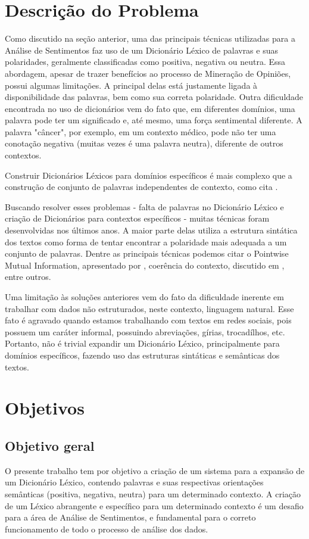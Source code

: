 \documentclass[a4paper,11pt]{article}
\begin{document}
\section{Descrição do Problema}
Como discutido na seção anterior, uma das principais técnicas utilizadas para a Análise de Sentimentos faz uso de um Dicionário Léxico de palavras e suas polaridades, geralmente classificadas como positiva, negativa ou neutra. Essa abordagem, apesar de trazer benefícios ao processo de Mineração de Opiniões, possui algumas limitações. A principal delas está justamente ligada à disponibilidade das palavras, bem como sua correta polaridade. Outra dificuldade encontrada no uso de dicionários vem do fato que, em diferentes domínios, uma palavra pode ter um significado e, até mesmo, uma força sentimental diferente. A palavra "câncer", por exemplo, em um contexto médico, pode não ter uma conotação negativa (muitas vezes é uma palavra neutra), diferente de outros contextos.

Construir Dicionários Léxicos para domínios específicos é mais complexo que a construção de conjunto de palavras independentes de contexto, como cita \cite{Kanayama2006}.

Buscando resolver esses problemas - falta de palavras no Dicionário Léxico e criação de Dicionários para contextos específicos - muitas técnicas foram desenvolvidas nos últimos anos. A maior parte delas utiliza a estrutura sintática dos textos como forma de tentar encontrar a polaridade mais adequada a um conjunto de palavras. Dentre as principais técnicas podemos citar o Pointwise Mutual Information, apresentado por \cite{Turney2002}, coerência do contexto, discutido em \cite{Kanayama2006}, entre outros.

Uma limitação às soluções anteriores vem do fato da dificuldade inerente em trabalhar com dados não estruturados, neste contexto, linguagem natural. Esse fato é agravado quando estamos trabalhando com textos em redes sociais, pois possuem um caráter informal, possuindo abreviações, gírias, trocadílhos, etc. Portanto, não é trivial expandir um Dicionário Léxico, principalmente para domínios específicos, fazendo uso das estruturas sintáticas e semânticas dos textos.

\section{Objetivos}
\label{sec:obj}
\subsection{Objetivo geral}
O presente trabalho tem por objetivo a criação de um sistema para a expansão de um Dicionário Léxico, contendo palavras e suas respectivas orientações semânticas (positiva, negativa, neutra) para um determinado contexto. A criação de um Léxico abrangente e específico para um determinado contexto é um desafio para a área de Análise de Sentimentos, e fundamental para o correto funcionamento de todo o processo de análise dos dados.
\end{document}
